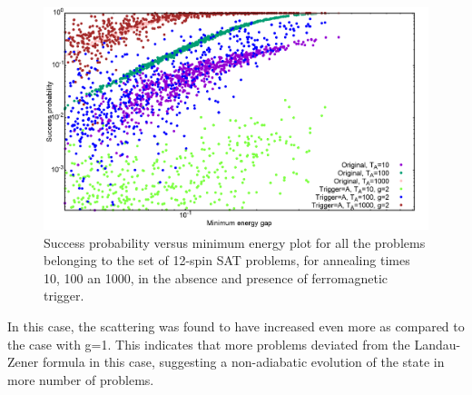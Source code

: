\documentclass[../main.tex]{subfiles}
\begin{document}
\begin{figure}[H]
\centering 
\includegraphics[scale=0.24]{SuccVsGap_OA_g2.png}
\caption{Success probability versus minimum energy plot for all the problems belonging to the set of 12-spin SAT problems, for annealing times 10, 100 an 1000, in the absence and presence of ferromagnetic trigger.}
\label{fig:a46}
\end{figure}

In this case, the scattering was found to have increased even more as compared to the case with g=1. This indicates that more problems deviated from the Landau-Zener formula in this case, suggesting a non-adiabatic evolution of the state in more number of problems.
\end{document}
